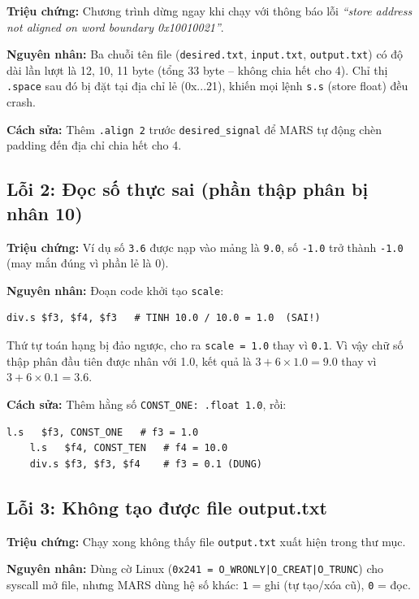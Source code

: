 \documentclass[twoside,final]{hcmut-report}
\begin{document}
\textbf{Triệu chứng:} Chương trình dừng ngay khi chạy với thông báo lỗi
\textit{``store address not aligned on word boundary 0x10010021''}.

\textbf{Nguyên nhân:} Ba chuỗi tên file (\texttt{desired.txt},
\texttt{input.txt}, \texttt{output.txt}) có độ dài lần lượt là 12, 10,
11 byte (tổng 33 byte -- không chia hết cho 4). Chỉ thị \texttt{.space}
sau đó bị đặt tại địa chỉ lẻ (0x...21), khiến mọi lệnh \texttt{s.s}
(store float) đều crash.

\textbf{Cách sửa:} Thêm \texttt{.align~2} trước \texttt{desired\_signal}
để MARS tự động chèn padding đến địa chỉ chia hết cho 4.

\subsection{Lỗi 2: Đọc số thực sai (phần thập phân bị nhân 10)}

\textbf{Triệu chứng:} Ví dụ số \texttt{3.6} được nạp vào mảng là
\texttt{9.0}, số \texttt{-1.0} trở thành \texttt{-1.0} (may mắn đúng
vì phần lẻ là 0).

\textbf{Nguyên nhân:} Đoạn code khởi tạo \texttt{scale}:
\begin{lstlisting}[language={}]
    div.s $f3, $f4, $f3   # TINH 10.0 / 10.0 = 1.0  (SAI!)
\end{lstlisting}
Thứ tự toán hạng bị đảo ngược, cho ra \texttt{scale = 1.0} thay vì \texttt{0.1}.
Vì vậy chữ số thập phân đầu tiên được nhân với 1.0, kết quả là
$3 + 6 \times 1.0 = 9.0$ thay vì $3 + 6 \times 0.1 = 3.6$.

\textbf{Cách sửa:} Thêm hằng số \texttt{CONST\_ONE: .float 1.0}, rồi:
\begin{lstlisting}[language={}]
    l.s   $f3, CONST_ONE   # f3 = 1.0
    l.s   $f4, CONST_TEN   # f4 = 10.0
    div.s $f3, $f3, $f4    # f3 = 0.1 (DUNG)
\end{lstlisting}

\subsection{Lỗi 3: Không tạo được file output.txt}

\textbf{Triệu chứng:} Chạy xong không thấy file \texttt{output.txt} xuất
hiện trong thư mục.

\textbf{Nguyên nhân:} Dùng cờ Linux (\texttt{0x241 = O\_WRONLY|O\_CREAT|O\_TRUNC})
cho syscall mở file, nhưng MARS dùng hệ số khác: \texttt{1} = ghi
(tự tạo/xóa cũ), \texttt{0} = đọc.
\end{document}
